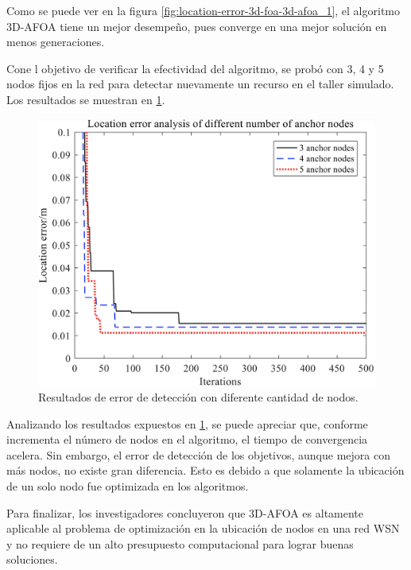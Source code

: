 \documentclass[letterpaper]{report}
\begin{document}
    Como se puede ver en la figura \ref{fig:location-error-3d-foa-3d-afoa_1}, el
    algoritmo 3D-AFOA tiene un mejor desempeño, pues converge en una mejor
    solución en menos generaciones. 

    Cone l objetivo de verificar la efectividad del algoritmo, se probó con 3, 4
    y 5 nodos fijos en la red para detectar nuevamente un recurso en el taller
    simulado. Los resultados se muestran en \ref{fig:location-error-3d-afoa_2}.

    \begin{figure}[ht!]
      \includegraphics[width=\textwidth]{location-error-3d-afoa_2.png}
      \centering
      \caption{Resultados de error de detección con diferente cantidad de
        nodos.}
      \label{fig:location-error-3d-afoa_2}
      \centering
    \end{figure}

    Analizando los resultados expuestos en \ref{fig:location-error-3d-afoa_2},
    se puede apreciar que, conforme incrementa el número de nodos en el
    algoritmo, el tiempo de convergencia acelera. Sin embargo, el
    error de detección de los objetivos, aunque mejora con más nodos, no existe
    gran diferencia. Esto es debido a que solamente la ubicación de un solo nodo
    fue optimizada en los algoritmos. 

    Para finalizar, los investigadores concluyeron que 3D-AFOA es altamente
    aplicable al problema de optimización en la ubicación de nodos en una red
    WSN y no requiere de un alto presupuesto computacional para lograr buenas
    soluciones. 
\end{document}

